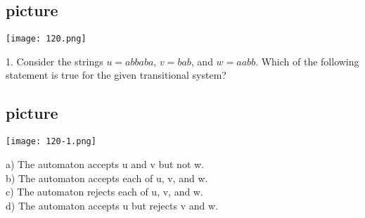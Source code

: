 \documentclass{article}
\begin{document}
\begin{center}
\section{picture}
\texttt{[image: 120.png]}
\end{center}

1. Consider the strings $u = abbaba$, $v = bab$, and $w = aabb$. Which of the following statement is true
for the given transitional system?\\
\begin{center}
\section{picture}
\texttt{[image: 120-1.png]}
\end{center}

\vspace*{0.1cm}
a) The automaton accepts u and v but not w.\\
b) The automaton accepts each of u, v, and w.\\
c) The automaton rejects each of u, v, and w.\\
d) The automaton accepts u but rejects v and w.\\
\end{document}
